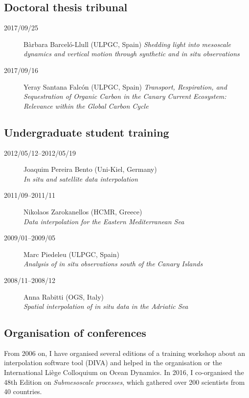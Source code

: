 \documentclass[11pt,a4paper,svgnames]{article}
\begin{document}
\subsection{Doctoral thesis tribunal}

\begin{description}
\item[2017/09/25] Bàrbara Barceló-Llull (ULPGC, Spain) {\newline \textit{Shedding light into mesoscale dynamics and vertical motion through synthetic and in situ observations}}

\item[2017/09/16] Yeray Santana Falc\'{o}n (ULPGC, Spain) {\newline \textit{Transport, Respiration, and Sequestration of Organic Carbon in the Canary Current Ecosystem: Relevance within the Global Carbon Cycle}}
\end{description}

\subsection{Undergraduate student training}
\begin{description}
\item[2012/05/12--2012/05/19] Joaquim Pereira Bento (Uni-Kiel, Germany)\\ \textit{In situ and satellite data interpolation}
\item[2011/09--2011/11] Nikolaos Zarokanellos (HCMR, Greece) \\ \textit{Data interpolation for the Eastern Mediterranean Sea}
\item[2009/01--2009/05] Marc Piedeleu (ULPGC, Spain)\\ \textit{Analysis of in situ observations south of the Canary Islands}
\item[2008/11--2008/12] Anna Rabitti (OGS, Italy)\\ \textit{Spatial interpolation of in situ data in the Adriatic Sea}
\end{description}

\subsection{Organisation of conferences}

\begin{summarybox}
From 2006 on, I have organised several editions of a training workshop about an interpolation software tool (DIVA) and helped in the organisation or the International Li\`{e}ge Colloquium on Ocean Dynamics. In 2016, I co-organised the 48th Edition on \textit{Submesoscale processes}, which gathered over 200 scientists from 40 countries.
\end{summarybox}
\end{document}
